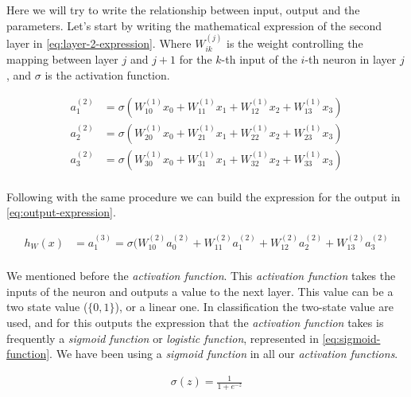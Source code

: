 Here we will try to write the relationship between input, output and
the parameters. Let's start by writing the mathematical expression of
the second layer in \autoref{eq:layer-2-expression}. Where
$W_{ik}^{(j)}$ is the weight controlling the mapping between layer $j$
and $j + 1$ for the $k$-th input of the $i$-th neuron in layer $j$,
and $\sigma$ is the activation function.

\begin{equation}
  \begin{aligned}
    \label{eq:layer-2-expression}
    a_1^{(2)} & = \sigma(W_{10}^{(1)} x_0 + W_{11}^{(1)} x_1
    + W_{12}^{(1)} x_2 + W_{13}^{(1)} x_3) \\
    a_2^{(2)} & = \sigma(W_{20}^{(1)} x_0 + W_{21}^{(1)} x_1
    + W_{22}^{(1)} x_2 + W_{23}^{(1)} x_3) \\
    a_3^{(2)} & = \sigma(W_{30}^{(1)} x_0 + W_{31}^{(1)} x_1
    + W_{32}^{(1)} x_2 + W_{33}^{(1)} x_3) \\
  \end{aligned}
\end{equation}

Following with the same procedure we can build the expression for the
output in \autoref{eq:output-expression}.

\begin{equation}
  \begin{aligned}
    \label{eq:output-expression}
    h_{W}(x) & = a_1^{(3)} = \sigma(W_{10}^{(2)} a_0^{(2)}
    + W_{11}^{(2)} a_1^{(2)} + W_{12}^{(2)} a_2^{(2)}
    + W_{13}^{(2)} a_3^{(2)} \\
  \end{aligned}
\end{equation}

We mentioned before the \textit{activation function}. This
\textit{activation function} takes the inputs of the neuron and
outputs a value to the next layer. This value can be a two state value
($\{0,1\}$), or a linear one. In classification the two-state value
are used, and for this outputs the expression that the
\textit{activation function} takes is frequently a \textit{sigmoid
function} or \textit{logistic function}, represented in
\autoref{eq:sigmoid-function}. We have been using a \textit{sigmoid
function} in all our \textit{activation functions}.

\begin{equation}
  \begin{aligned}
    \label{eq:sigmoid-function}
    \sigma(z) = \frac{1}{1 + e^{-z}}
  \end{aligned}
\end{equation}

